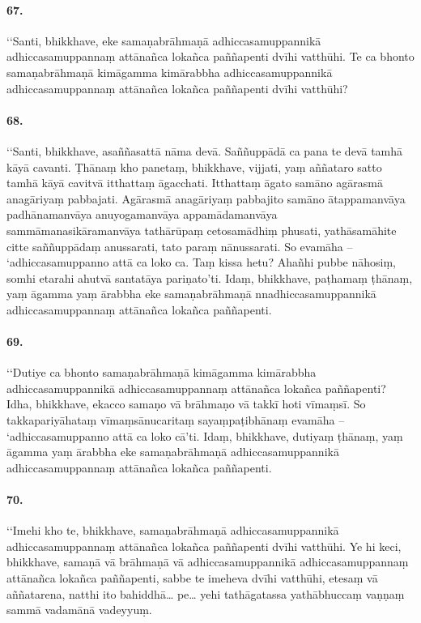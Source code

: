 \paragraph{67.}
‘‘Santi, bhikkhave, eke samaṇabrāhmaṇā adhiccasamuppannikā adhiccasamuppannaṃ attānañca lokañca paññapenti dvīhi vatthūhi. Te ca bhonto samaṇabrāhmaṇā kimāgamma kimārabbha adhiccasamuppannikā adhiccasamuppannaṃ attānañca lokañca paññapenti dvīhi vatthūhi?

\paragraph{68.}
‘‘Santi, bhikkhave, asaññasattā nāma devā. Saññuppādā ca pana te devā tamhā kāyā cavanti. Ṭhānaṃ kho panetaṃ, bhikkhave, vijjati, yaṃ aññataro satto tamhā kāyā cavitvā itthattaṃ āgacchati. Itthattaṃ āgato samāno agārasmā anagāriyaṃ pabbajati. Agārasmā anagāriyaṃ pabbajito samāno ātappamanvāya padhānamanvāya anuyogamanvāya appamādamanvāya sammāmanasikāramanvāya tathārūpaṃ cetosamādhiṃ phusati, yathāsamāhite citte saññuppādaṃ anussarati, tato paraṃ nānussarati. So evamāha – ‘adhiccasamuppanno attā ca loko ca. Taṃ kissa hetu? Ahañhi pubbe nāhosiṃ, somhi etarahi ahutvā santatāya pariṇato’ti. Idaṃ, bhikkhave, paṭhamaṃ ṭhānaṃ, yaṃ āgamma yaṃ ārabbha eke samaṇabrāhmaṇā nnadhiccasamuppannikā adhiccasamuppannaṃ attānañca lokañca paññapenti.

\paragraph{69.}
‘‘Dutiye ca bhonto samaṇabrāhmaṇā kimāgamma kimārabbha adhiccasamuppannikā adhiccasamuppannaṃ attānañca lokañca paññapenti? Idha, bhikkhave, ekacco samaṇo vā brāhmaṇo vā takkī hoti vīmaṃsī. So takkapariyāhataṃ vīmaṃsānucaritaṃ sayaṃpaṭibhānaṃ evamāha – ‘adhiccasamuppanno attā ca loko cā’ti. Idaṃ, bhikkhave, dutiyaṃ ṭhānaṃ, yaṃ āgamma yaṃ ārabbha eke samaṇabrāhmaṇā adhiccasamuppannikā adhiccasamuppannaṃ attānañca lokañca paññapenti.

\paragraph{70.}
‘‘Imehi kho te, bhikkhave, samaṇabrāhmaṇā adhiccasamuppannikā adhiccasamuppannaṃ attānañca lokañca paññapenti dvīhi vatthūhi. Ye hi keci, bhikkhave, samaṇā vā brāhmaṇā vā adhiccasamuppannikā adhiccasamuppannaṃ attānañca lokañca paññapenti, sabbe te imeheva dvīhi vatthūhi, etesaṃ vā aññatarena, natthi ito bahiddhā… pe… yehi tathāgatassa yathābhuccaṃ vaṇṇaṃ sammā vadamānā vadeyyuṃ.

